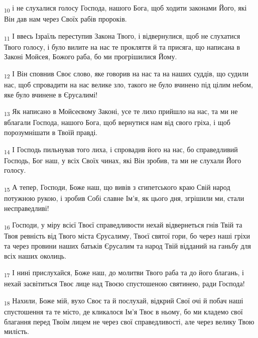 \begin{tcolorbox}
\textsubscript{10} і не слухалися голосу Господа, нашого Бога, щоб ходити законами Його, які Він дав нам через Своїх рабів пророків.
\end{tcolorbox}
\begin{tcolorbox}
\textsubscript{11} І ввесь Ізраїль переступив Закона Твого, і відвернулися, щоб не слухатися Твого голосу, і було вилите на нас те прокляття й та присяга, що написана в Законі Мойсея, Божого раба, бо ми прогрішилися Йому.
\end{tcolorbox}
\begin{tcolorbox}
\textsubscript{12} І Він сповнив Своє слово, яке говорив на нас та на наших суддів, що судили нас, щоб спровадити на нас велике зло, такого не було вчинено під цілим небом, яке було вчинене в Єрусалимі!
\end{tcolorbox}
\begin{tcolorbox}
\textsubscript{13} Як написано в Мойсеєвому Законі, усе те лихо прийшло на нас, та ми не вблагали Господа, нашого Бога, щоб вернутися нам від свого гріха, і щоб порозумнішати в Твоїй правді.
\end{tcolorbox}
\begin{tcolorbox}
\textsubscript{14} І Господь пильнував того лиха, і спровадив його на нас, бо справедливий Господь, Бог наш, у всіх Своїх чинах, які Він зробив, та ми не слухали Його голосу.
\end{tcolorbox}
\begin{tcolorbox}
\textsubscript{15} А тепер, Господи, Боже наш, що вивів з єгипетського краю Свій народ потужною рукою, і зробив Собі славне Ім'я, як цього дня, згрішили ми, стали несправедливі!
\end{tcolorbox}
\begin{tcolorbox}
\textsubscript{16} Господи, у міру всієї Твоєї справедливости нехай відвернеться гнів Твій та Твоя ревність від Твого міста Єрусалиму, Твоєї святої гори, бо через наші гріхи та через провини наших батьків Єрусалим та народ Твій відданий на ганьбу для всіх наших околиць.
\end{tcolorbox}
\begin{tcolorbox}
\textsubscript{17} І нині прислухайся, Боже наш, до молитви Твого раба та до його благань, і нехай засвітиться Твоє лице над Твоєю спустошеною святинею, ради Господа!
\end{tcolorbox}
\begin{tcolorbox}
\textsubscript{18} Нахили, Боже мій, вухо Своє та й послухай, відкрий Свої очі й побач наші спустошення та те місто, де кликалося Ім'я Твоє в ньому, бо ми кладемо свої благання перед Твоїм лицем не через свої справедливості, але через велику Твою милість.
\end{tcolorbox}
